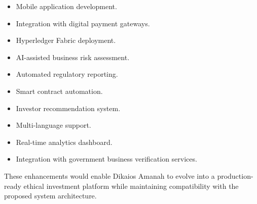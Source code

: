 \begin{itemize}

\item Mobile application development.

\item Integration with digital payment gateways.

\item Hyperledger Fabric deployment.

\item AI-assisted business risk assessment.

\item Automated regulatory reporting.

\item Smart contract automation.

\item Investor recommendation system.

\item Multi-language support.

\item Real-time analytics dashboard.

\item Integration with government business verification services.

\end{itemize}

These enhancements would enable Dikaios Amanah to evolve into a production-ready ethical investment platform while maintaining compatibility with the proposed system architecture.
